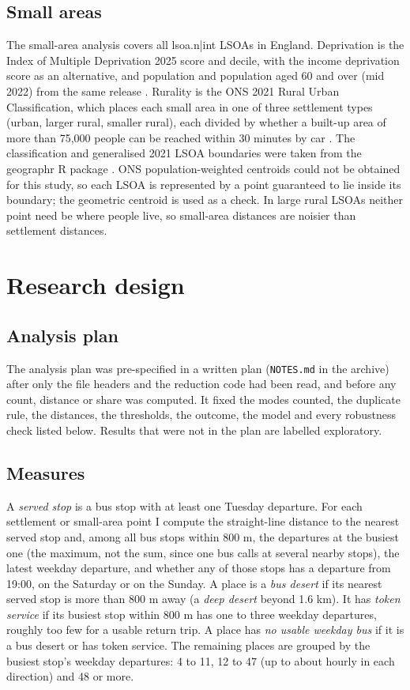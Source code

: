 \documentclass[11pt,a4paper]{article}
\begin{document}
\subsection{Small areas}
The small-area analysis covers all {{lsoa.n|int}} LSOAs in England. Deprivation is the Index of Multiple Deprivation 2025 score and decile, with the income deprivation score as an alternative, and population and population aged 60 and over (mid 2022) from the same release \citep{iod2025}. Rurality is the ONS 2021 Rural Urban Classification, which places each small area in one of three settlement types (urban, larger rural, smaller rural), each divided by whether a built-up area of more than 75,000 people can be reached within 30 minutes by car \citep{ons2021ruc}. The classification and generalised 2021 LSOA boundaries were taken from the geographr R package \citep{geographr}. ONS population-weighted centroids could not be obtained for this study, so each LSOA is represented by a point guaranteed to lie inside its boundary; the geometric centroid is used as a check. In large rural LSOAs neither point need be where people live, so small-area distances are noisier than settlement distances.

\section{Research design}\label{sec:design}
\subsection{Analysis plan}
The analysis plan was pre-specified in a written plan (\texttt{NOTES.md} in the archive) after only the file headers and the reduction code had been read, and before any count, distance or share was computed. It fixed the modes counted, the duplicate rule, the distances, the thresholds, the outcome, the model and every robustness check listed below. Results that were not in the plan are labelled exploratory.

\subsection{Measures}
A \textit{served stop} is a bus stop with at least one Tuesday departure. For each settlement or small-area point I compute the straight-line distance to the nearest served stop and, among all bus stops within 800 m, the departures at the busiest one (the maximum, not the sum, since one bus calls at several nearby stops), the latest weekday departure, and whether any of those stops has a departure from 19:00, on the Saturday or on the Sunday. A place is a \textit{bus desert} if its nearest served stop is more than 800 m away (a \textit{deep desert} beyond 1.6 km). It has \textit{token service} if its busiest stop within 800 m has one to three weekday departures, roughly too few for a usable return trip. A place has \textit{no usable weekday bus} if it is a bus desert or has token service. The remaining places are grouped by the busiest stop's weekday departures: 4 to 11, 12 to 47 (up to about hourly in each direction) and 48 or more.
\end{document}

